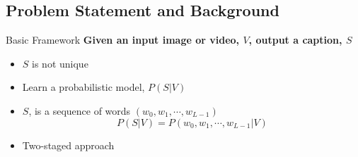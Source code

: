 \documentclass{beamer}
\begin{document}
\subsection{Problem Statement and Background}
\begin{frame}{Basic Framework}
\textbf{Given an input image or video, $V$, output a caption, $S$}
\begin{itemize}
\item<2-> $S$ is not unique
\item<3-> Learn a probabilistic model, $P(S|V)$
\item<4-> $S$, is a sequence of words $(w_0, w_1,\cdots, w_{L-1})$
\begin{equation}
\label{eq:langB1} P(S|V) = P(w_0, w_1, \cdots, w_{L-1}|V)
\end{equation}
\item<5-> Two-staged approach
\end{itemize} 
\end{frame}
\end{document}
